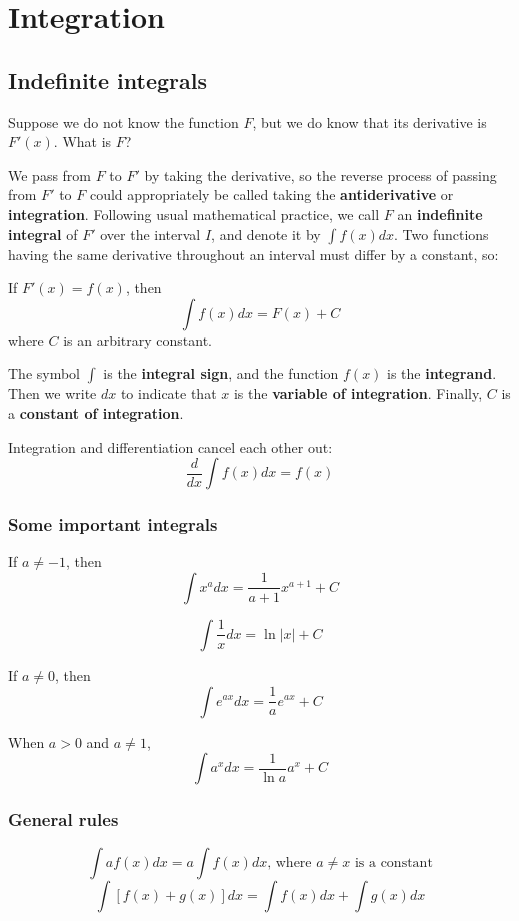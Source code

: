 \documentclass[10pt,a4paper]{book}
\theoremstyle{definition}\newtheorem{definition}{Definition}
\theoremstyle{definition}\newtheorem{fact}{Fact}
\theoremstyle{definition}\newtheorem{ex}{Ex.}
\theoremstyle{definition}\newtheorem{project}{Project}
\theoremstyle{definition}\newtheorem{problem}{Problem}
\theoremstyle{definition}\newtheorem{example}{Example}
\numberwithin{theorem}{chapter}
\numberwithin{corollary}{chapter}
\numberwithin{assumption}{chapter}
\numberwithin{definition}{chapter}
\numberwithin{prop}{chapter}
\numberwithin{notation}{chapter}
\numberwithin{problem}{chapter}
\numberwithin{example}{chapter}
\numberwithin{fact}{chapter}
\numberwithin{ex}{chapter}
\begin{document}
	
	\chapter{Integration}
	\section{Indefinite integrals}
	
	Suppose we do not know the function $F$, but we do know that its derivative is $F'(x)$. What is $F$?
	
	We pass from $F$ to $F'$ by taking the derivative, so the reverse process of passing from $F'$ to $F$ could appropriately be called taking the \textbf{antiderivative} or \textbf{integration}. Following usual mathematical practice, we call $F$ an \textbf{indefinite integral} of $F'$ over the interval $I$, and denote it by $\int f(x)dx$. Two functions having the same derivative throughout an interval must differ by a constant, so:
	
	If $F'(x) = f(x)$, then 
	$$\int f(x) dx = F(x) + C$$
	where $C$ is an arbitrary constant.
	
	The symbol $\int$ is the \textbf{integral sign}, and the function $f (x)$ is the \textbf{integrand}. Then we write $dx$ to indicate that $x$ is the \textbf{variable of integration}. Finally, $C$ is a \textbf{constant of integration}. 
	
	Integration and differentiation cancel each other out:
	$$\frac{d}{dx}\int f(x) dx = f(x)$$
	
	\subsection{Some important integrals}
	
	If $a \neq -1$, then
	$$\int x^a dx = \frac{1}{a+1}x^{a+1} + C$$
	
	$$\int \frac{1}{x}dx = \ln |x| + C$$
	
	If $a \neq 0$, then
	$$\int e^{ax} dx = \frac{1}{a}e^{ax} + C$$
	
	When $a>0$ and $a \neq 1$,
	$$\int a^x dx = \frac{1}{\ln a}a^x + C$$
	
	\subsection{General rules}
	$$\int af(x) dx = a \int f(x) dx \text{, where $a\neq x$ is a constant} $$
	$$\int [f(x)+g(x)] dx = \int f(x) dx + \int g(x) dx$$
	
\end{document}
